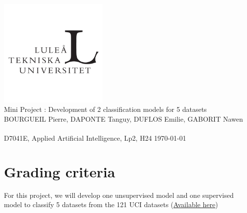 \documentclass[10pt, a4paper]{article}
\author{}
\begin{document}
    \begin{titlepage}      
        \begin{center}
            \includegraphics[width=0.4\textwidth]{lulea-tekniska-universitet-logo.png}\\[4cm]
            \huge{Mini Project : Development of 2 classification models for 5 datasets}\\[1cm]
            \linespread{1.2}\large { BOURGUEIL Pierre, DAPONTE Tanguy, DUFLOS Emilie, GABORIT Nawen}\\[0.5cm]
            \linespread{1}~\\[2cm]
            {\Large D7041E, Applied Artificial Intelligence, Lp2, H24}    
            \vfill
            \today
        \end{center}
    \end{titlepage}

\newpage

\tableofcontents
\newpage

\section{Grading criteria}
For this project, we will develop one unsupervised model and one supervised model to classify 5 datasets from the 121 UCI datasets (\href{https://archive.ics.uci.edu/datasets}{Available here})
\end{document}
